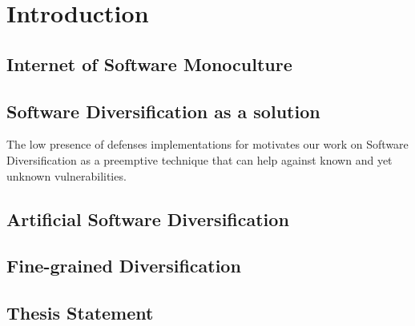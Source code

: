 \chapter{Introduction}






\newcommand{\subscript}[2]{$#1 _ #2$}

\newcommand{\rqone}{RQ1. To what extent can we artifically generate program variants for \wasm?}

\newcommand{\rqtwo}{RQ2. To what extent are the generated variants dynamically different?}
\newcommand{\rqthree}{RQ3. To what extent do the artificial variants exhibit different execution times on Edge-Cloud platforms?}


\section*{Internet of Software Monoculture}

\section*{Software Diversification as a solution}

The low presence of defenses implementations for \wasm motivates our work on Software Diversification as a preemptive technique that can help against known and yet unknown vulnerabilities.

\section*{Artificial Software Diversification}


\section*{Fine-grained Diversification}

\section{Thesis Statement}



